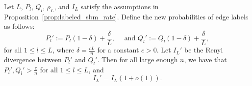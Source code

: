 \documentclass{article}
\begin{document}
\begin{lemma}\label{lemma: first}
Let $L$, $P_l$, $Q_l$, $\rho_L$, and $I_L$ satisfy the assumptions in Proposition~\ref{prop:labeled_sbm_rate}. Define the new probabilities of edge labels as follows:
\begin{equation}
P_l' := P_l(1-\delta) + \frac{\delta}{L}, \quad \text{ and }
Q_l' := Q_l(1-\delta) + \frac{\delta}{L},
\end{equation}
for all $1 \leq l \leq L$, where $\delta = \frac{cL}{n}$ for a constant $c>0$. Let $I_L'$ be the  Renyi divergence between $P_l'$ and $Q_l'$. Then for all large enough $n$, we have that $P_l', Q_l' > \frac{c}{n}$ for all $1 \leq l \leq L$, and 
\begin{equation}
I_L' = I_L(1+o(1)).
\end{equation}
\end{lemma}
\end{document}
